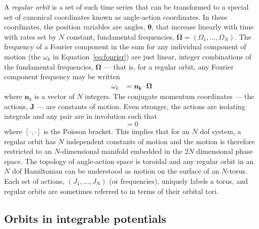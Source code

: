 \documentclass[letterpaper,12pt,preprint]{aastex}
\begin{document}
A \emph{regular orbit} is a set of such time series that can be transformed to a special set of canonical coordinates known as angle-action coordinates. In these coordinates, the position variables are angles, $\boldsymbol{\theta}$, that increase linearly with time with rates set by $N$ constant, fundamental frequencies, $\boldsymbol{\Omega} = (\Omega_1, ..., \Omega_N)$. The frequency of a Fourier component in the sum for any individual component of motion (the $\omega_k$ in Equation~\ref{eq:fourier}) are just linear, integer combinations of the fundamental frequencies, $\boldsymbol{\Omega}$ --- that is, for a regular orbit, any Fourier component frequency may be written
\begin{align}
	\omega_k &= \boldsymbol{n_k} \cdot \boldsymbol{\Omega} \label{eq:fourierfreq}
\end{align} %
where $\boldsymbol{n}_k$ is a vector of $N$ integers. The conjugate momentum coordinates --- the actions,  $\boldsymbol{J}$ --- are constants of motion. Even stronger, the actions are isolating integrals and any pair are in involution such that
\begin{equation}
	[J_i, J_j] = 0
\end{equation}
where $[\cdot,\cdot]$ is the Poisson bracket. This implies that for an $N$ dof system, a regular orbit has $N$ independent constants of motion and the motion is therefore restricted to an $N$-dimensional manifold embedded in the 2$N$ dimensional phase space. The topology of angle-action space is toroidal and any regular orbit in an $N$ dof Hamiltonian can be understood as motion on the surface of an $N$-torus. Each set of actions, $(J_1,...,J_N)$ (or frequencies), uniquely labels a torus, and regular orbits are sometimes referred to in terms of their orbital tori. 

\subsection{Orbits in integrable potentials}
\end{document}
